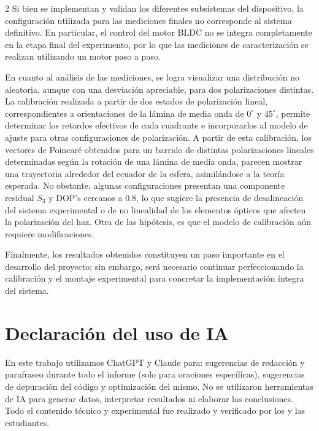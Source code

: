 \documentclass[11pt,a4paper]{article}
\begin{document}
\begin{multicols}{2}
Si bien se implementan y validan los diferentes subsistemas del dispositivo, la configuración utilizada para las mediciones finales no corresponde al sistema definitivo. En particular, el control del motor BLDC no se integra completamente en la etapa final del experimento, por lo que las mediciones de caracterización se realizan utilizando un motor paso a paso.

En cuanto al análisis de las mediciones, se logra visualizar una distribución no aleatoria, aunque con una desviación apreciable, para dos polarizaciones distintas. La calibración realizada a partir de dos estados de polarización lineal, correspondientes a orientaciones de la lámina de media onda de $0^\circ$ y $45^\circ$, permite determinar los retardos efectivos de cada cuadrante e incorporarlos al modelo de ajuste para otras configuraciones de polarización. A partir de esta calibración, los vectores de Poincaré obtenidos para un barrido de distintas polarizaciones lineales determinadas según la rotación de una lámina de media onda, parecen mostrar una trayectoria alrededor del ecuador de la esfera, asimilándose a la teoría esperada. No obstante, algunas configuraciones presentan una componente residual $S_3$ y DOP's cercanos a 0.8, lo que sugiere la presencia de desalineación del sistema experimental o de no linealidad de los elementos ópticos que afecten la polarización del haz. Otra de las hipótesis, es que el modelo de calibración aún requiere modificaciones.

Finalmente, los resultados obtenidos constituyen un paso importante en el desarrollo del proyecto; sin embargo, será necesario continuar perfeccionando la calibración y el montaje experimental para concretar la implementación íntegra del sistema.

\end{multicols}

\printbibliography

\section{Declaración del uso de IA}
En este trabajo utilizamos ChatGPT y Claude para: sugerencias de redacción y parafraseo durante todo el informe (solo para oraciones específicas), sugerencias de depuración del código y optimización del mismo. No se utilizaron herramientas de IA para generar datos, interpretar resultados ni elaborar las conclusiones. Todo el contenido técnico y experimental fue realizado y verificado por los y las estudiantes.
\end{document}
